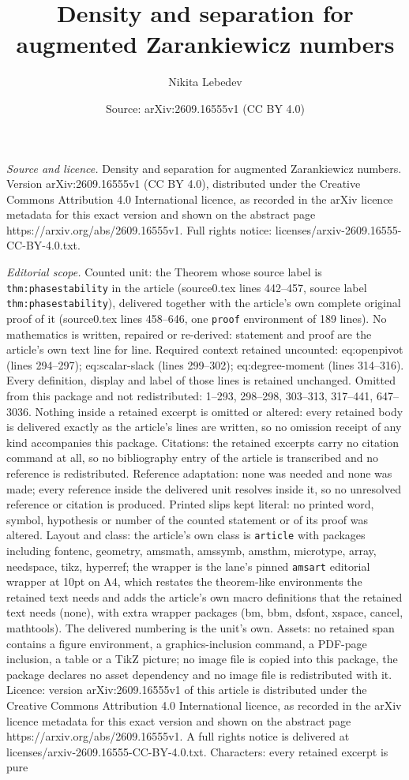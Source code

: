 \documentclass[10pt,a4paper]{amsart}
\title[Density and separation for augmented Zarankiewicz numbers]{Density and separation for augmented Zarankiewicz numbers}
\author{Nikita Lebedev}
\date{Source: arXiv:2609.16555v1 (CC BY 4.0)}
\begin{document}
\maketitle

\noindent\emph{Source and licence.} Density and separation for augmented Zarankiewicz numbers. Version arXiv:2609.16555v1 (CC BY 4.0), distributed under the Creative Commons Attribution 4.0 International licence, as recorded in the arXiv licence metadata for this exact version and shown on the abstract page https://arxiv.org/abs/2609.16555v1. Full rights notice: licenses/arxiv-2609.16555-CC-BY-4.0.txt.\par\smallskip

\noindent\textit{Editorial scope.} Counted unit: the Theorem whose source label is \texttt{thm:phasestability} in the article (source0.tex lines 442--457, source label \texttt{thm:phasestability}), delivered together with the article's own complete original proof of it (source0.tex lines 458--646, one \texttt{proof} environment of 189 lines). No mathematics is written, repaired or re-derived: statement and proof are the article's own text line for line. Required context retained uncounted: eq:openpivot (lines 294--297); eq:scalar-slack (lines 299--302); eq:degree-moment (lines 314--316). Every definition, display and label of those lines is retained unchanged. Omitted from this package and not redistributed: 1--293, 298--298, 303--313, 317--441, 647--3036. Nothing inside a retained excerpt is omitted or altered: every retained body is delivered exactly as the article's lines are written, so no omission receipt of any kind accompanies this package. Citations: the retained excerpts carry no citation command at all, so no bibliography entry of the article is transcribed and no reference is redistributed. Reference adaptation: none was needed and none was made; every reference inside the delivered unit resolves inside it, so no unresolved reference or citation is produced. Printed slips kept literal: no printed word, symbol, hypothesis or number of the counted statement or of its proof was altered. Layout and class: the article's own class is \texttt{article} with packages including fontenc, geometry, amsmath, amssymb, amsthm, microtype, array, needspace, tikz, hyperref; the wrapper is the lane's pinned \texttt{amsart} editorial wrapper at 10pt on A4, which restates the theorem-like environments the retained text needs and adds the article's own macro definitions that the retained text needs (none), with extra wrapper packages (bm, bbm, dsfont, xspace, cancel, mathtools). The delivered numbering is the unit's own. Assets: no retained span contains a figure environment, a graphics-inclusion command, a PDF-page inclusion, a table or a TikZ picture; no image file is copied into this package, the package declares no asset dependency and no image file is redistributed with it. Licence: version arXiv:2609.16555v1 of this article is distributed under the Creative Commons Attribution 4.0 International licence, as recorded in the arXiv licence metadata for this exact version and shown on the abstract page https://arxiv.org/abs/2609.16555v1. A full rights notice is delivered at licenses/arxiv-2609.16555-CC-BY-4.0.txt. Characters: every retained excerpt is pure 
\end{document}
